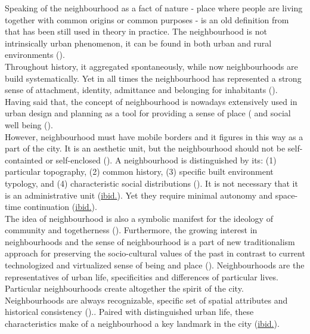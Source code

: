 \documentclass[11pt]{report}
\begin{document}
Speaking of the neighbourhood as a fact of nature - place where people are living together with common origins or common purposes - is an old definition from \href{Mumford}{\citealt{mumford_neighborhood_1954}} that has been still used in theory in practice.
The neighbourhood is not intrinsically urban phenomenon, it can be found in both urban and rural environments
(\href{Merlin}{\citealt{choay_dictionnaire_2010}}).
\\

Throughout history, it aggregated spontaneously, while now neighbourhoods are build systematically.
Yet in all times the neighbourhood has represented a strong sense of attachment, identity, admittance and belonging for inhabitants (\href{Meenakshi}{\citealt{meenakshi_neighborhood_2011}}).
Having said that, the concept of neighbourhood is nowadays extensively used in urban design and planning as a tool for providing a sense of place (\href{Patricios}{\citealt{patricios_urban_2002}} and social well being (\href{Meenakshi}{\citealt{meenakshi_neighborhood_2011}}).
\\

However, neighbourhood must have mobile borders and it figures in this way as a part of the city. It is an aesthetic unit, but the neighbourhood should not be self-containted or self-enclosed (\href{Mumford}{\citealt{mumford_neighborhood_1954}}).
A neighbourhood is distinguished by its: (1) particular topography, (2) common history, (3) specific built environment typology, and (4) characteristic social distributions
(\href{Merlin}{\citealt{choay_dictionnaire_2010}}).
It is not necessary that it is an administrative unit (\href{Merlin}{ibid.}).
Yet they require minimal autonomy and space-time continuation (\href{Merlin}{ibid.}).
\\

The idea of neighbourhood is also a symbolic manifest for the ideology of community and togetherness (\href{Lefebvre}{\citealt{lefebvre_production_1974}}).
Furthermore, the growing interest in neighbourhoods and the sense of neighbourhood is a part of new traditionalism approach for preserving the socio-cultural values of the past in contrast to current technologized and virtualized sense of being and place (\href{Meenakshi}{\citealt{meenakshi_neighborhood_2011}}).
Neighbourhoods are the representatives of urban life, specificities and differences of particular lives.
Particular neighbourhoods create altogether the spirit of the city.
Neighbourhoods are always recognizable, specific set of spatial attributes and historical consistency (\href{Merlin}{\citealt{choay_dictionnaire_2010}})..
Paired with distinguished urban life, these characteristics make of a neighbourhood a key landmark in the city (\href{Merlin}{ibid.}).
\end{document}
